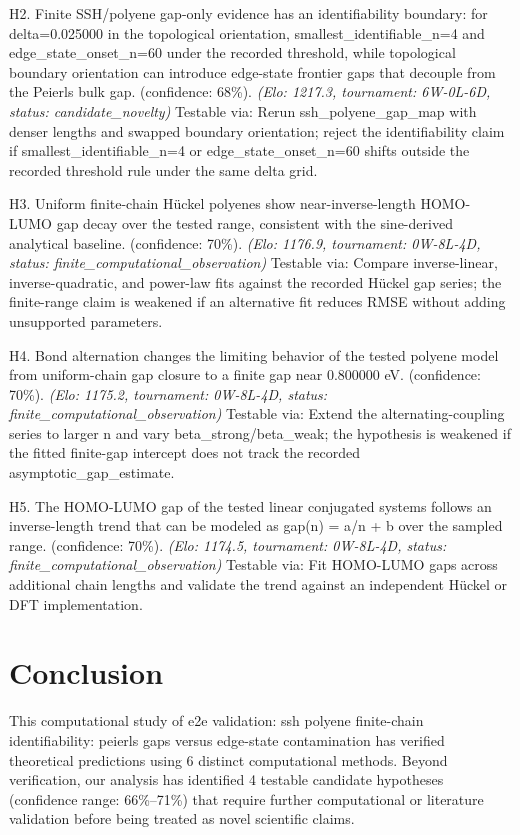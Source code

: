 \documentclass[11pt,a4paper]{article}
\begin{document}
H2. Finite SSH/polyene gap-only evidence has an identifiability boundary: for delta=0.025000 in the topological orientation, smallest\_identifiable\_n=4 and edge\_state\_onset\_n=60 under the recorded threshold, while topological boundary orientation can introduce edge-state frontier gaps that decouple from the Peierls bulk gap. (confidence: 68\%). \textit{(Elo: 1217.3, tournament: 6W-0L-6D, status: candidate\_novelty)} Testable via: Rerun ssh\_polyene\_gap\_map with denser lengths and swapped boundary orientation; reject the identifiability claim if smallest\_identifiable\_n=4 or edge\_state\_onset\_n=60 shifts outside the recorded threshold rule under the same delta grid.

H3. Uniform finite-chain Hückel polyenes show near-inverse-length HOMO-LUMO gap decay over the tested range, consistent with the sine-derived analytical baseline. (confidence: 70\%). \textit{(Elo: 1176.9, tournament: 0W-8L-4D, status: finite\_computational\_observation)} Testable via: Compare inverse-linear, inverse-quadratic, and power-law fits against the recorded Hückel gap series; the finite-range claim is weakened if an alternative fit reduces RMSE without adding unsupported parameters.

H4. Bond alternation changes the limiting behavior of the tested polyene model from uniform-chain gap closure to a finite gap near 0.800000 eV. (confidence: 70\%). \textit{(Elo: 1175.2, tournament: 0W-8L-4D, status: finite\_computational\_observation)} Testable via: Extend the alternating-coupling series to larger n and vary beta\_strong/beta\_weak; the hypothesis is weakened if the fitted finite-gap intercept does not track the recorded asymptotic\_gap\_estimate.

H5. The HOMO-LUMO gap of the tested linear conjugated systems follows an inverse-length trend that can be modeled as gap(n) = a/n + b over the sampled range. (confidence: 70\%). \textit{(Elo: 1174.5, tournament: 0W-8L-4D, status: finite\_computational\_observation)} Testable via: Fit HOMO-LUMO gaps across additional chain lengths and validate the trend against an independent Hückel or DFT implementation.


\section{Conclusion}
This computational study of e2e validation: ssh polyene finite-chain identifiability: peierls gaps versus edge-state contamination has verified theoretical predictions using 6 distinct computational methods. Beyond verification, our analysis has identified 4 testable candidate hypotheses (confidence range: 66\%–71\%) that require further computational or literature validation before being treated as novel scientific claims.
\end{document}
